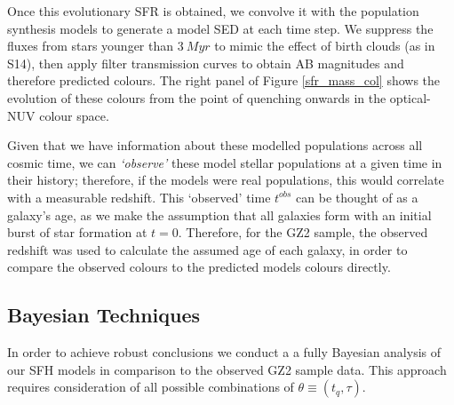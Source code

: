 \documentclass{mn2e}
\begin{document}
Once this evolutionary SFR is obtained, we convolve it with the \citet{BC03} population synthesis models to generate a model SED at each time step. We suppress the fluxes from stars younger than $3~Myr$ to mimic the effect of birth clouds (as in S14), then apply filter transmission curves to obtain AB magnitudes and therefore predicted colours. The right panel of Figure \ref{sfr_mass_col} shows the evolution of these colours from the point of quenching onwards in the optical-NUV colour space.

Given that we have information about these modelled populations across all cosmic time, we can \emph{`observe'} these model stellar populations at a given time in their history; therefore, if the models were real populations, this would correlate with a measurable redshift. This `observed' time $t^{obs}$ can be thought of as a galaxy's age, as we make the assumption that all galaxies form with an initial burst of star formation at $t=0$. Therefore, for the GZ2 sample, the observed redshift was used to calculate the assumed age of each galaxy, in order to compare the observed colours to the predicted models colours directly. 

\subsection{Bayesian Techniques}
In order to achieve robust conclusions we conduct a a fully Bayesian analysis \citep{Sivia, MacKay} of our SFH models in comparison to the observed GZ2 sample data. This approach requires consideration of all possible combinations of $\theta \equiv (t_{q}, \tau)$. %
\end{document}
